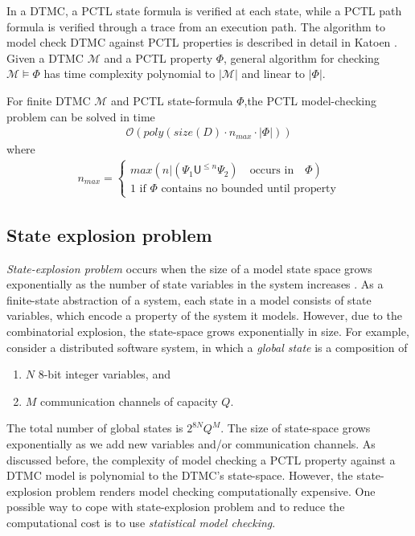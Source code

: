 \noindent  In a DTMC, a PCTL state formula is verified at each state, while a PCTL path formula is
verified through a trace from an execution path. The algorithm to model check DTMC against PCTL
properties is described in detail in Katoen \cite{baier2008principles}. Given a DTMC $\mathcal{M}$
and a PCTL property $\Phi$, general algorithm for checking $\mathcal{M}\models\Phi$ has time
complexity polynomial to $|\mathcal{M}|$ and linear to $|\Phi|$.
\begin{theorem}
      For finite DTMC $\mathcal{M}$ and PCTL state-formula $\Phi$,the PCTL model-checking problem
      can be solved in time
      \begin{align*}
            \mathcal{O}(poly(size(D)\cdot n_{max} \cdot |\Phi|))
      \end{align*}
      where
      \begin{align*}
            n_{max} =
            \begin{cases}
                  max(n | (\Psi_1 \mathsf{U}^{\leq n} \Psi_2) \quad\text{occurs in}\quad \Phi) \\
                  1 \text{ if $\Phi$ contains no bounded until property}
            \end{cases}
      \end{align*}
\end{theorem}

\subsection{State explosion problem}
\textit{State-explosion problem} occurs when the size of a model state space grows exponentially as
the number of state variables in the system increases \cite{clarke2011model}. As a finite-state
abstraction of a system, each state in a model consists of state variables, which encode a property
of the system it models. However, due to the combinatorial explosion, the state-space grows
exponentially in size. For example, consider a distributed software system, in which a
\textit{global state} is a composition of
\begin{enumerate}
      \item $N$ 8-bit integer variables, and
      \item $M$ communication channels of capacity $Q$.
\end{enumerate}
The total number of global states is $2^{8N}Q^M$. The size of state-space grows exponentially as we
add new variables and/or communication channels. As discussed before, the complexity of model
checking a PCTL property against a DTMC model is polynomial to the DTMC's state-space. However, the
state-explosion problem renders model checking computationally expensive. One possible way to cope
with state-explosion problem and to reduce the computational cost is to use \textit{statistical
      model checking}.

